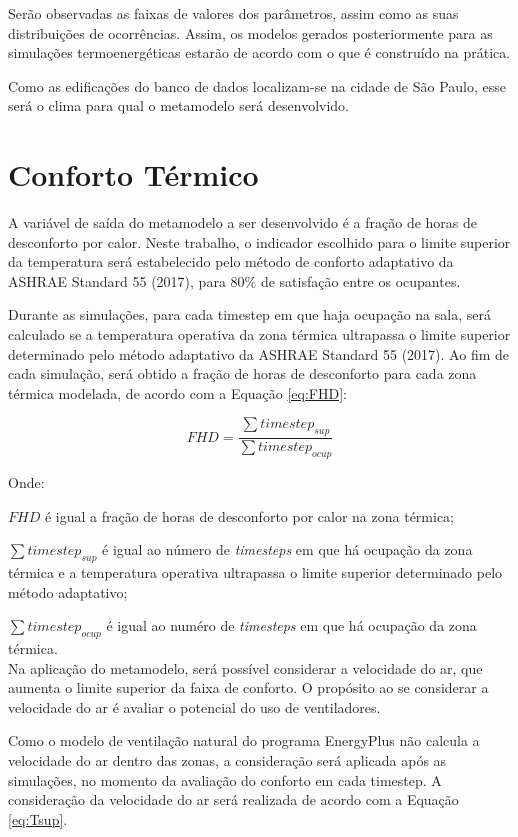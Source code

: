 \documentclass[brazil,hardcopy,openany,a5paper]{ufscthesis}
\begin{document}
		Serão observadas as faixas de valores dos parâmetros, assim como as suas distribuições de ocorrências. Assim, os modelos gerados posteriormente para as simulações termoenergéticas estarão de acordo com o que é construído na prática.
		
		Como as edificações do banco de dados localizam-se na cidade de São Paulo, esse será o clima para qual o metamodelo será desenvolvido.
		
		\section{Conforto Térmico}
		
		A variável de saída do metamodelo a ser desenvolvido é a fração de horas de desconforto por calor. Neste trabalho, o indicador escolhido para o limite superior da temperatura será estabelecido pelo método de conforto adaptativo da ASHRAE Standard 55 (2017), para 80\% de satisfação entre os ocupantes.
		
		Durante as simulações, para cada timestep em que haja ocupação na sala, será calculado se a temperatura operativa da zona térmica ultrapassa o limite superior determinado pelo método adaptativo da ASHRAE Standard 55 (2017). Ao fim de cada simulação, será obtido a fração de horas de desconforto para cada zona térmica modelada, de acordo com a Equação \ref{eq:FHD}:
		
		\begin{equation}
		\label{eq:FHD}
		FHD = \frac{\sum{timestep_{sup}}}{\sum{timestep_{ocup}}}
		\end{equation}
		
		Onde:
		
		$FHD$ é igual a fração de horas de desconforto por calor na zona térmica;
		
		$\sum{timestep_{sup}}$ é igual ao número de \textit{timesteps} em que há ocupação da zona térmica e a temperatura operativa ultrapassa o limite superior determinado pelo método adaptativo;
		
		$\sum{timestep_{ocup}}$ é igual ao numéro de \textit{timesteps} em que há ocupação da zona térmica.
		\\
		
		Na aplicação do metamodelo, será possível considerar a velocidade do ar, que aumenta o limite superior da faixa de conforto. O propósito ao se considerar a velocidade do ar é avaliar o potencial do uso de ventiladores.		
		
		Como o modelo de ventilação natural do programa EnergyPlus não calcula a velocidade do ar dentro das zonas, a consideração será aplicada após as simulações, no momento da avaliação do conforto em cada timestep. A consideração da velocidade do ar será realizada de acordo com a Equação \ref{eq:Tsup}.
		
\end{document}

